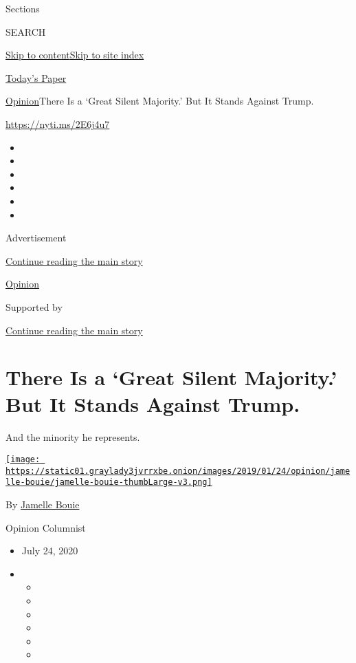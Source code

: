 Sections

SEARCH

\protect\hyperlink{site-content}{Skip to
content}\protect\hyperlink{site-index}{Skip to site index}

\href{https://myaccount.nytimes3xbfgragh.onion/auth/login?response_type=cookie\&client_id=vi}{}

\href{https://www.nytimes3xbfgragh.onion/section/todayspaper}{Today's
Paper}

\href{/section/opinion}{Opinion}\textbar{}There Is a `Great Silent
Majority.' But It Stands Against Trump.

\href{https://nyti.ms/2E6j4u7}{https://nyti.ms/2E6j4u7}

\begin{itemize}
\item
\item
\item
\item
\item
\item
\end{itemize}

Advertisement

\protect\hyperlink{after-top}{Continue reading the main story}

\href{/section/opinion}{Opinion}

Supported by

\protect\hyperlink{after-sponsor}{Continue reading the main story}

\hypertarget{there-is-a-great-silent-majority-but-it-stands-against-trump}{%
\section{There Is a `Great Silent Majority.' But It Stands Against
Trump.}\label{there-is-a-great-silent-majority-but-it-stands-against-trump}}

And the minority he represents.

\href{https://www.nytimes3xbfgragh.onion/column/jamelle-bouie}{\texttt{[image: https://static01.graylady3jvrrxbe.onion/images/2019/01/24/opinion/jamelle-bouie/jamelle-bouie-thumbLarge-v3.png]}}

By
\href{https://www.nytimes3xbfgragh.onion/column/jamelle-bouie}{Jamelle
Bouie}

Opinion Columnist

\begin{itemize}
\item
  July 24, 2020
\item
  \begin{itemize}
  \item
  \item
  \item
  \item
  \item
  \item
  \end{itemize}
\end{itemize}

